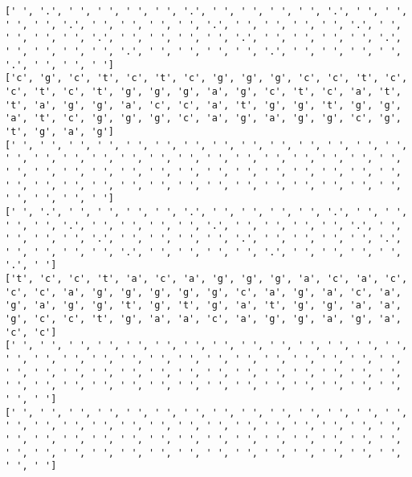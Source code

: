 \documentclass{article}
\begin{document}
\begin{Verbatim}
[' ', '.', ' ', ' ', ' ', ' ', '.', ' ', ' ', ' ', ' ', '.', ' ', ' ', ' ', ' ', '.', ' ', ' ', ' ', ' ', '.', ' ', ' ', ' ', ' ', '.', ' ', ' ', ' ', ' ', '.', ' ', ' ', ' ', ' ', '.', ' ', ' ', ' ', ' ', '.', ' ', ' ', ' ', ' ', '.', ' ', ' ', ' ', ' ', '.', ' ', ' ', ' ', ' ', '.', ' ', ' ', ' ']
['c', 'g', 'c', 't', 'c', 't', 'c', 'g', 'g', 'g', 'c', 'c', 't', 'c', 'c', 't', 'c', 't', 'g', 'g', 'g', 'a', 'g', 'c', 't', 'c', 'a', 't', 't', 'a', 'g', 'g', 'a', 'c', 'c', 'a', 't', 'g', 'g', 't', 'g', 'g', 'a', 't', 'c', 'g', 'g', 'g', 'c', 'a', 'g', 'a', 'g', 'g', 'c', 'g', 't', 'g', 'a', 'g']
[' ', ' ', ' ', ' ', ' ', ' ', ' ', ' ', ' ', ' ', ' ', ' ', ' ', ' ', ' ', ' ', ' ', ' ', ' ', ' ', ' ', ' ', ' ', ' ', ' ', ' ', ' ', ' ', ' ', ' ', ' ', ' ', ' ', ' ', ' ', ' ', ' ', ' ', ' ', ' ', ' ', ' ', ' ', ' ', ' ', ' ', ' ', ' ', ' ', ' ', ' ', ' ', ' ', ' ', ' ', ' ', ' ', ' ', ' ', ' ']
[' ', '.', ' ', ' ', ' ', ' ', '.', ' ', ' ', ' ', ' ', '.', ' ', ' ', ' ', ' ', '.', ' ', ' ', ' ', ' ', '.', ' ', ' ', ' ', ' ', '.', ' ', ' ', ' ', ' ', '.', ' ', ' ', ' ', ' ', '.', ' ', ' ', ' ', ' ', '.', ' ', ' ', ' ', ' ', '.', ' ', ' ', ' ', ' ', '.', ' ', ' ', ' ', ' ', '.', ' ']
['t', 'c', 'c', 't', 'a', 'c', 'a', 'g', 'g', 'g', 'a', 'c', 'a', 'c', 'c', 'c', 'a', 'g', 'g', 'g', 'g', 'g', 'c', 'a', 'g', 'a', 'c', 'a', 'g', 'a', 'g', 'g', 't', 'g', 't', 'g', 'a', 't', 'g', 'g', 'a', 'a', 'g', 'c', 'c', 't', 'g', 'a', 'a', 'c', 'a', 'g', 'g', 'a', 'g', 'a', 'c', 'c']
[' ', ' ', ' ', ' ', ' ', ' ', ' ', ' ', ' ', ' ', ' ', ' ', ' ', ' ', ' ', ' ', ' ', ' ', ' ', ' ', ' ', ' ', ' ', ' ', ' ', ' ', ' ', ' ', ' ', ' ', ' ', ' ', ' ', ' ', ' ', ' ', ' ', ' ', ' ', ' ', ' ', ' ', ' ', ' ', ' ', ' ', ' ', ' ', ' ', ' ', ' ', ' ', ' ', ' ', ' ', ' ', ' ', ' ']
[' ', ' ', ' ', ' ', ' ', ' ', ' ', ' ', ' ', ' ', ' ', ' ', ' ', ' ', ' ', ' ', ' ', ' ', ' ', ' ', ' ', ' ', ' ', ' ', ' ', ' ', ' ', ' ', ' ', ' ', ' ', ' ', ' ', ' ', ' ', ' ', ' ', ' ', ' ', ' ', ' ', ' ', ' ', ' ', ' ', ' ', ' ', ' ', ' ', ' ', ' ', ' ', ' ', ' ', ' ', ' ', ' ', ' ']
 

\end{Verbatim}
\end{document}
